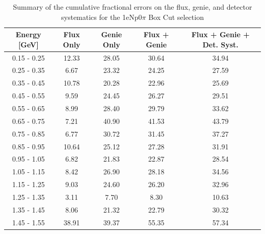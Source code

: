 \documentclass[a4paper]{article}
\begin{document}
\begin{table}[H]
\centering
 \begin{tabular}{| c | c | c | c | c |} 
\hline
Energy [GeV] & Flux Only & Genie Only  & Flux + Genie & Flux + Genie + Det. Syst. \\
\hline
0.15 - 0.25&12.33&28.05&30.64&34.94\\
0.25 - 0.35&6.67&23.32&24.25&27.59\\
0.35 - 0.45&10.78&20.28&22.96&25.69\\
0.45 - 0.55&9.59&24.45&26.27&29.51\\
0.55 - 0.65&8.99&28.40&29.79&33.62\\
0.65 - 0.75&7.21&40.90&41.53&43.79\\
0.75 - 0.85&6.77&30.72&31.45&37.27\\
0.85 - 0.95&10.64&25.12&27.28&31.91\\
0.95 - 1.05&6.82&21.83&22.87&28.54\\
1.05 - 1.15&8.42&26.90&28.18&34.56\\
1.15 - 1.25&9.03&24.60&26.20&32.96\\
1.25 - 1.35&3.11&7.70&8.30&10.63\\
1.35 - 1.45&8.06&21.32&22.79&30.32\\
1.45 - 1.55&38.91&39.37&55.35&57.34\\
\hline
\end{tabular}
\caption{Summary of the cumulative fractional errors on the flux, genie, and detector systematics for the 1eNp0$\pi$ Box Cut selection}
\label{tab:1e0p0pi_boxcut_errors}
\end{table}
\end{document}
